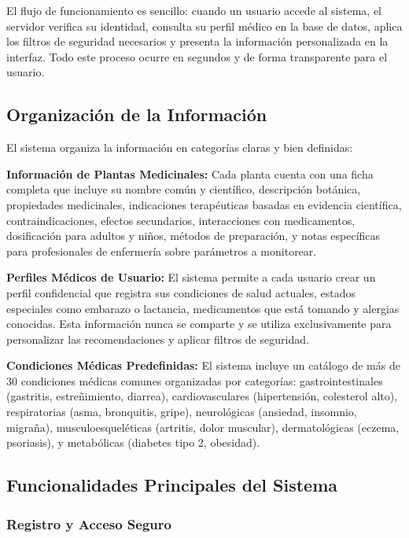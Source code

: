 \documentclass[12pt,a4paper]{article}
\begin{document}
El flujo de funcionamiento es sencillo: cuando un usuario accede al sistema, el servidor verifica su identidad, consulta su perfil médico en la base de datos, aplica los filtros de seguridad necesarios y presenta la información personalizada en la interfaz. Todo este proceso ocurre en segundos y de forma transparente para el usuario.

\subsection{Organización de la Información}

El sistema organiza la información en categorías claras y bien definidas:

\textbf{Información de Plantas Medicinales:} Cada planta cuenta con una ficha completa que incluye su nombre común y científico, descripción botánica, propiedades medicinales, indicaciones terapéuticas basadas en evidencia científica, contraindicaciones, efectos secundarios, interacciones con medicamentos, dosificación para adultos y niños, métodos de preparación, y notas específicas para profesionales de enfermería sobre parámetros a monitorear.

\textbf{Perfiles Médicos de Usuario:} El sistema permite a cada usuario crear un perfil confidencial que registra sus condiciones de salud actuales, estados especiales como embarazo o lactancia, medicamentos que está tomando y alergias conocidas. Esta información nunca se comparte y se utiliza exclusivamente para personalizar las recomendaciones y aplicar filtros de seguridad.

\textbf{Condiciones Médicas Predefinidas:} El sistema incluye un catálogo de más de 30 condiciones médicas comunes organizadas por categorías: gastrointestinales (gastritis, estreñimiento, diarrea), cardiovasculares (hipertensión, colesterol alto), respiratorias (asma, bronquitis, gripe), neurológicas (ansiedad, insomnio, migraña), musculoesqueléticas (artritis, dolor muscular), dermatológicas (eczema, psoriasis), y metabólicas (diabetes tipo 2, obesidad).

\subsection{Funcionalidades Principales del Sistema}

\subsubsection{Registro y Acceso Seguro}
\end{document}
